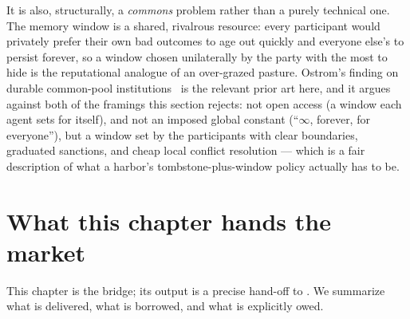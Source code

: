 \documentclass[11pt,a4paper]{article}
\theoremstyle{definition}
\begin{document}
\noindent It is also, structurally, a \emph{commons} problem rather than a purely
technical one. The memory window is a shared, rivalrous resource: every participant
would privately prefer their own bad outcomes to age out quickly and everyone
else's to persist forever, so a window chosen unilaterally by the party with the
most to hide is the reputational analogue of an over-grazed pasture. Ostrom's
finding on durable common-pool institutions~ is the relevant prior
art here, and it argues against both of the framings this section rejects: not
open access (a window each agent sets for itself), and not an imposed global
constant (``$\infty$, forever, for everyone''), but a window set by the
participants with clear boundaries, graduated sanctions, and cheap local conflict
resolution --- which is a fair description of what a harbor's tombstone-plus-window
policy actually has to be.



\pdexercisepointer{\ref{ex:stp-tombstone-vs-delete}}{\ref{ex:stp-revocation-convergence}}{\pageref{ex:stp-tombstone-vs-delete}}

\section{What this chapter hands the market}\label{sec:handoff}

This chapter is the bridge; its output is a precise hand-off to . We summarize what is delivered, what is borrowed, and what is
explicitly owed.
\end{document}
